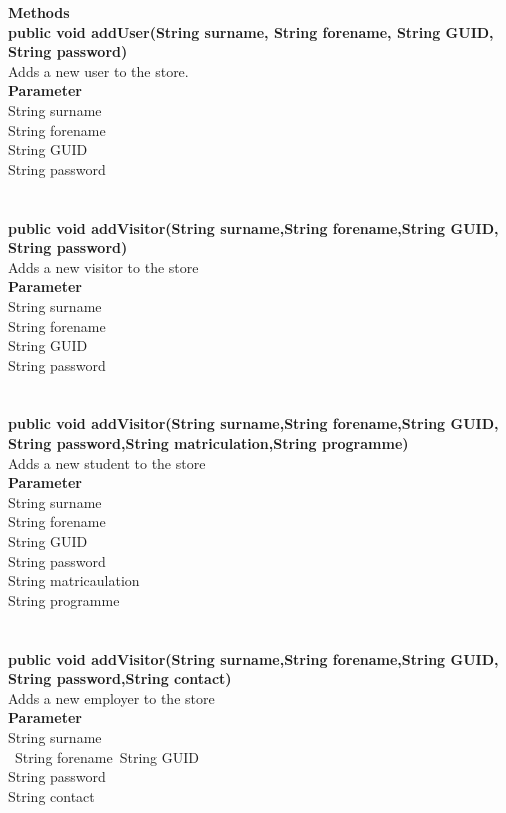 \documentclass{l3deliverable}
\begin{document}
\textbf{Methods}
\\
\textbf{public void addUser(String surname, String forename, String GUID, String password)}\\
Adds a new user to the store.\\
\textbf{Parameter}\\
String surname\\
String forename\\
String GUID\\
String password\\
\\
\\
\textbf{public void addVisitor(String surname,String forename,String GUID, String password)}\\
Adds a new visitor to the store\\
\textbf{Parameter}\\
String surname\\
String forename\\
String GUID\\
String password\\
\\
\\
\textbf{public void addVisitor(String surname,String forename,String GUID, String password,String matriculation,String programme)}\\
Adds a new student to the store\\
\textbf{Parameter}\\
String surname\\
String forename\\
String GUID\\
String password\\
String matricaulation\\
String programme\\
\\
\\
\textbf{public void addVisitor(String surname,String forename,String GUID, String password,String contact)}\\
Adds a new employer to the store\\
\textbf{Parameter}\\
String surname\\\
String forename\
String GUID\\
String password\\
String contact\\
\\
\\
\end{document}

